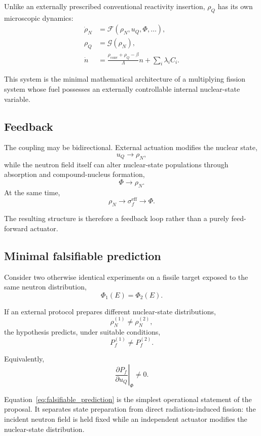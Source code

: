 Unlike an externally prescribed conventional reactivity insertion, $\rho_Q$ has its own microscopic dynamics:
\begin{align}
\dot{\rho}_N
&=
\mathcal{F}(\rho_N,u_Q,\Phi,\ldots),
\\
\rho_Q
&=
\mathcal{G}(\rho_N),
\\
\dot n
&=
\frac{\rho_{\mathrm{conv}}+\rho_Q-\beta}{\Lambda}n
+
\sum_i\lambda_iC_i.
\end{align}

This system is the minimal mathematical architecture of a multiplying fission system whose fuel possesses an externally controllable internal nuclear-state variable.

\subsection{Feedback}

The coupling may be bidirectional. External actuation modifies the nuclear state,
\begin{equation}
u_Q\rightarrow\rho_N,
\end{equation}
while the neutron field itself can alter nuclear-state populations through absorption and compound-nucleus formation,
\begin{equation}
\Phi\rightarrow\rho_N.
\end{equation}
At the same time,
\begin{equation}
\rho_N
\rightarrow
\sigma_f^{\mathrm{eff}}
\rightarrow
\Phi.
\end{equation}

The resulting structure is therefore a feedback loop rather than a purely feed-forward actuator.

\subsection{Minimal falsifiable prediction}

Consider two otherwise identical experiments on a fissile target exposed to the same neutron distribution,
\begin{equation}
\Phi_1(E)=\Phi_2(E).
\end{equation}

If an external protocol prepares different nuclear-state distributions,
\begin{equation}
\rho_N^{(1)}
\neq
\rho_N^{(2)},
\end{equation}
the hypothesis predicts, under suitable conditions,
\begin{equation}
P_f^{(1)}
\neq
P_f^{(2)}.
\end{equation}

Equivalently,
\begin{equation}
\boxed{
\left.
\frac{\partial P_f}{\partial u_Q}
\right|_{\Phi}
\neq0.
}
\label{eq:falsifiable_prediction}
\end{equation}

Equation~\eqref{eq:falsifiable_prediction} is the simplest operational statement of the proposal. It separates state preparation from direct radiation-induced fission: the incident neutron field is held fixed while an independent actuator modifies the nuclear-state distribution.
